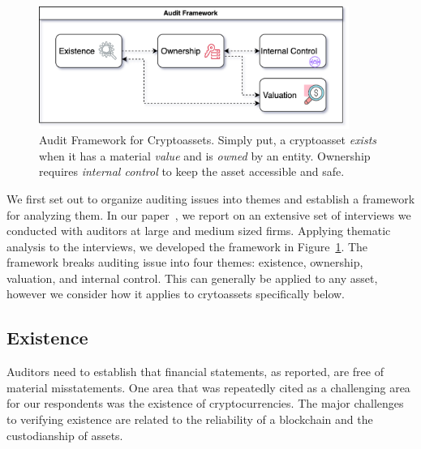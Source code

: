 \begin{figure}[t]\label{fig:audit_framework}
    \centering
    \includegraphics[width=0.9\textwidth]{figures/audit_framework.png}
    \caption[Audit Framework for Cryptoassets]{Audit Framework for Cryptoassets. Simply put, a cryptoasset \textit{exists} when it has a material \textit{value} and is \textit{owned} by an entity. Ownership requires \textit{internal control} to keep the asset accessible and safe.}
\end{figure}	

We first set out to organize auditing issues into themes and establish a framework for analyzing them. In our paper~\cite{pimentel2021systemizing}, we report on an extensive set of interviews we conducted with auditors at large and medium sized firms. Applying thematic analysis to the interviews, we developed the framework in Figure~\ref{fig:audit_framework}. The framework breaks auditing issue into four themes: existence, ownership, valuation, and internal control. This can generally be applied to any asset, however we consider how it applies to crytoassets specifically below.


\subsection{Existence} \label{sec:auditing:framework:existence}
Auditors need to establish that financial statements, as reported, are free of material misstatements. One area that was repeatedly cited as a challenging area for our respondents was the existence of cryptocurrencies. The major challenges to verifying existence are related to the reliability of a blockchain and the custodianship of assets.

